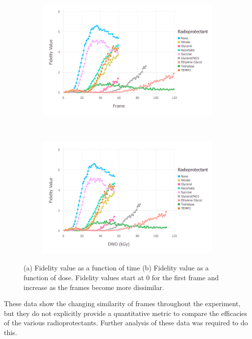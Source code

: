 \begin{figure}
    \ContinuedFloat
    \begin{subfigure}[b]{1.0\textwidth}
            \centering
            \includegraphics[width=\textwidth]{figures/saxs/cmpd_plt_frame.pdf}
            \caption{}
            \label{fig:1D scatter plot of frames 1 and 120}
    \end{subfigure}
    \\
    \begin{subfigure}[b]{1.0\textwidth}
            \centering
            \includegraphics[width=\textwidth]{figures/saxs/cmpd_plt_dose.pdf}
            \caption{}
            \label{fig:Pairwise correlation frames 1 and 120}
    \end{subfigure}
    \caption[Fidelity value as a function of time and dose.]{(a) Fidelity value as a function of time
    (b) Fidelity value as a function of dose.
    Fidelity values start at 0 for the first frame and increase as the frames become more dissimilar.}
    \label{fig:Rebecca data}
\end{figure}
These data show the changing similarity of frames throughout the experiment, but they do not explicitly provide a quantitative metric to compare the efficacies of the various radioprotectants.
Further analysis of these data was required to do this.

